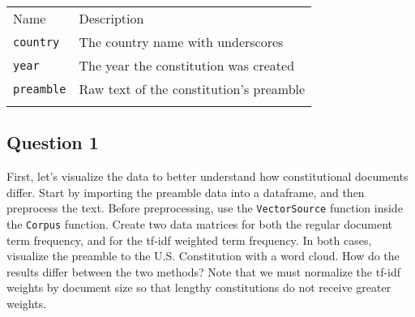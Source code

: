 \documentclass[]{article}
\begin{document}
\begin{longtable}[c]{@{}ll@{}}
\toprule\addlinespace
\begin{minipage}[b]{0.26\columnwidth}\raggedright
Name
\end{minipage} & \begin{minipage}[b]{0.67\columnwidth}\raggedright
Description
\end{minipage}
\\\addlinespace
\midrule\endhead
\begin{minipage}[t]{0.26\columnwidth}\raggedright
\texttt{country}
\end{minipage} & \begin{minipage}[t]{0.67\columnwidth}\raggedright
The country name with underscores
\end{minipage}
\\\addlinespace
\begin{minipage}[t]{0.26\columnwidth}\raggedright
\texttt{year}
\end{minipage} & \begin{minipage}[t]{0.67\columnwidth}\raggedright
The year the constitution was created
\end{minipage}
\\\addlinespace
\begin{minipage}[t]{0.26\columnwidth}\raggedright
\texttt{preamble}
\end{minipage} & \begin{minipage}[t]{0.67\columnwidth}\raggedright
Raw text of the constitution's preamble
\end{minipage}
\\\addlinespace
\bottomrule
\end{longtable}

\subsection{Question 1}\label{question-1}

First, let's visualize the data to better understand how constitutional
documents differ. Start by importing the preamble data into a dataframe,
and then preprocess the text. Before preprocessing, use the
\texttt{VectorSource} function inside the \texttt{Corpus} function.
Create two data matrices for both the regular document term frequency,
and for the tf-idf weighted term frequency. In both cases, visualize the
preamble to the U.S. Constitution with a word cloud. How do the results
differ between the two methods? Note that we must normalize the tf-idf
weights by document size so that lengthy constitutions do not receive
greater weights.
\end{document}
